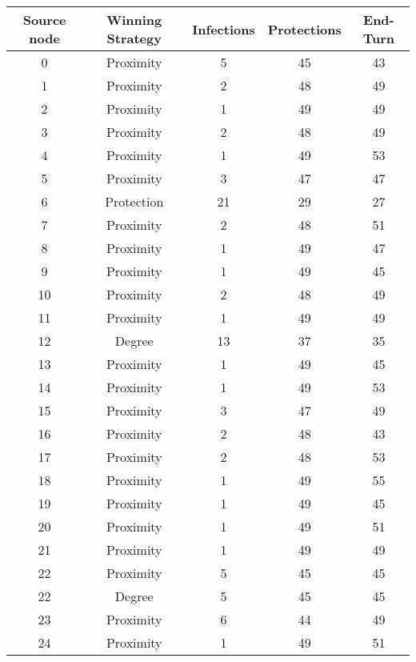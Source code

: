 \documentclass[results.tex]{subfiles}
\begin{document}
\begin{center}
  \begin{tabular}{| c || c | c | c | c |}
    \hline
    {\bfseries Source node} & {\bfseries Winning Strategy} & {\bfseries Infections} & {\bfseries Protections} & {\bfseries End-Turn} \\  %
    \hline\hline
    0 & Proximity & 5 & 45 & 43 \\ 
    \hline
    1 & Proximity & 2 & 48 & 49 \\ 
    \hline
    2 & Proximity & 1 & 49 & 49 \\ 
    \hline
    3 & Proximity & 2 & 48 & 49 \\ 
    \hline
    4 & Proximity & 1 & 49 & 53 \\ 
    \hline
    5 & Proximity & 3 & 47 & 47 \\ 
    \hline
    6 & Protection & 21 & 29 & 27 \\ 
    \hline
    7 & Proximity & 2 & 48 & 51 \\ 
    \hline
    8 & Proximity & 1 & 49 & 47 \\ 
    \hline
    9 & Proximity & 1 & 49 & 45 \\ 
    \hline
    10 & Proximity & 2 & 48 & 49 \\ 
    \hline
    11 & Proximity & 1 & 49 & 49 \\ 
    \hline
    12 & Degree & 13 & 37 & 35 \\ 
    \hline
    13 & Proximity & 1 & 49 & 45 \\ 
    \hline
    14 & Proximity & 1 & 49 & 53 \\ 
    \hline
    15 & Proximity & 3 & 47 & 49 \\ 
    \hline
    16 & Proximity & 2 & 48 & 43 \\ 
    \hline
    17 & Proximity & 2 & 48 & 53 \\ 
    \hline
    18 & Proximity & 1 & 49 & 55 \\ 
    \hline
    19 & Proximity & 1 & 49 & 45 \\ 
    \hline
    20 & Proximity & 1 & 49 & 51 \\ 
    \hline
    21 & Proximity & 1 & 49 & 49 \\ 
    \hline
    22 & Proximity & 5 & 45 & 45 \\ 
    \hline
    22 & Degree & 5 & 45 & 45 \\ 
    \hline
    23 & Proximity & 6 & 44 & 49 \\ 
    \hline
    24 & Proximity & 1 & 49 & 51 \\ 

\end{tabular}
\end{center}
\end{document}
